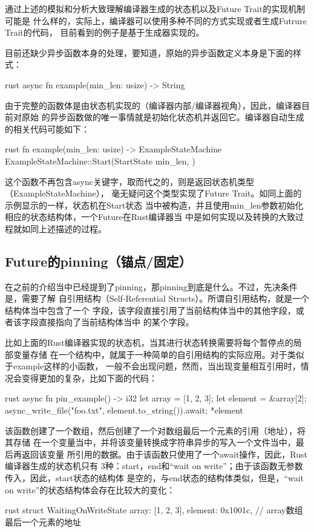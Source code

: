 通过上述的模拟和分析大致理解编译器生成的状态机以及Future Trait的实现机制可能是
什么样的，实际上，编译器可以使用多种不同的方式实现或者生成Futrure Trait的代码，
目前看到的例子是基于生成器实现的。

目前还缺少异步函数本身的处理，要知道，原始的异步函数定义本身是下面的样式：
\begin{code-block}{rust}
async fn example(min_len: usize) -> String
\end{code-block}
由于完整的函数体是由状态机实现的（编译器内部/编译器视角），因此，编译器目前对原始
的异步函数做的唯一事情就是初始化状态机并返回它。编译器自动生成的相关代码可能如下：
\begin{code-block}{rust}
fn example(min_len: usize) -> ExampleStateMachine {
    ExampleStateMachine::Start(StartState { min_len, })
}
\end{code-block}
这个函数不再包含async关键字，取而代之的，则是返回状态机类型（ExampleStateMachine），
毫无疑问这个类型实现了Future Trait。如同上面的示例显示的一样，状态机在Start状态
当中被构造，并且使用min\_len参数初始化相应的状态结构体，一个Future在Rust编译器当
中是如何实现以及转换的大致过程就如同上述描述的过程。

\subsection{Future的pinning（锚点/固定）}
在之前的介绍当中已经提到了pinning，那pinning到底是什么。不过，先决条件是，需要了解
自引用结构（Self-Referential Structs）。所谓自引用结构，就是一个结构体当中包含了一个
字段，该字段直接引用了当前结构体当中的其他字段，或者该字段直接指向了当前结构体当中
的某个字段。

比如上面的Rust编译器实现的状态机，当其进行状态转换需要将每个暂停点的局部变量存储
在一个结构中，就属于一种简单的自引用结构的实际应用。对于类似于example这样的小函数，
一般不会出现问题，然而，当出现变量相互引用时，情况会变得更加的复杂，比如下面的代码：
\begin{code-block}{rust}
async fn pin_example() -> i32 {
    let array = [1, 2, 3];
    let element = &array[2];
    async_write_file("foo.txt", element.to_string()).await;
    *element
}
\end{code-block}

该函数创建了一个数组，然后创建了一个对数组最后一个元素的引用（地址），将其存储
在一个变量当中，并将该变量转换成字符串异步的写入一个文件当中，最后再返回该变量
所引用的数据。由于该函数只使用了一个await操作，因此，Rust编译器生成的状态机只有
3种：start，end和“wait on write”；由于该函数无参数传入，因此，start状态的结构体
是空的，与end状态的结构体类似，但是，“wait on write”的状态结构体会存在比较大的变化：
\begin{code-block}{rust}
struct WaitingOnWriteState {
    array: [1, 2, 3],
    element: 0x1001c, // array数组最后一个元素的地址
}
\end{code-block}

